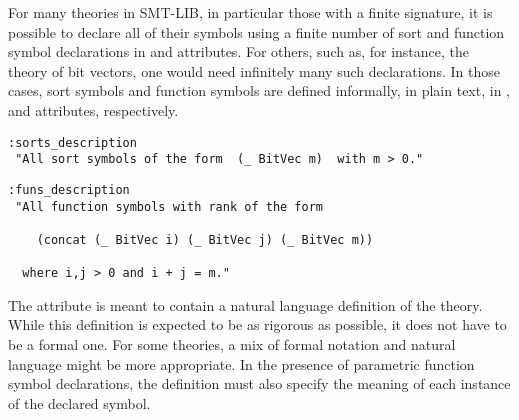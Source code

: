 For many theories in SMT-LIB, in particular those with a finite signature, 
it is possible to declare all of their symbols
using a finite number of sort and function symbol declarations
in  and  attributes.
For others, such as, for instance, the theory of bit vectors,
one would need infinitely many such declarations.
In those cases, 
sort symbols and function symbols are defined informally, in plain text,
in , and  attributes,
respectively.

\begin{lstlisting}[linewidth=39em]
:sorts_description
 "All sort symbols of the form  (_ BitVec m)  with m > 0."
\end{lstlisting}

\begin{lstlisting}[linewidth=35em]
:funs_description
 "All function symbols with rank of the form

    (concat (_ BitVec i) (_ BitVec j) (_ BitVec m))

  where i,j > 0 and i + j = m."
\end{lstlisting}
\medskip


The  attribute is meant to contain
a natural language definition of the theory.
While this definition is expected to be as rigorous as possible,
it does not have to be a formal one.
For some theories, 
a mix of formal notation and natural language might be more appropriate.
In the presence of parametric function symbol declarations,
the definition must also specify the meaning of each instance of the
declared symbol.

